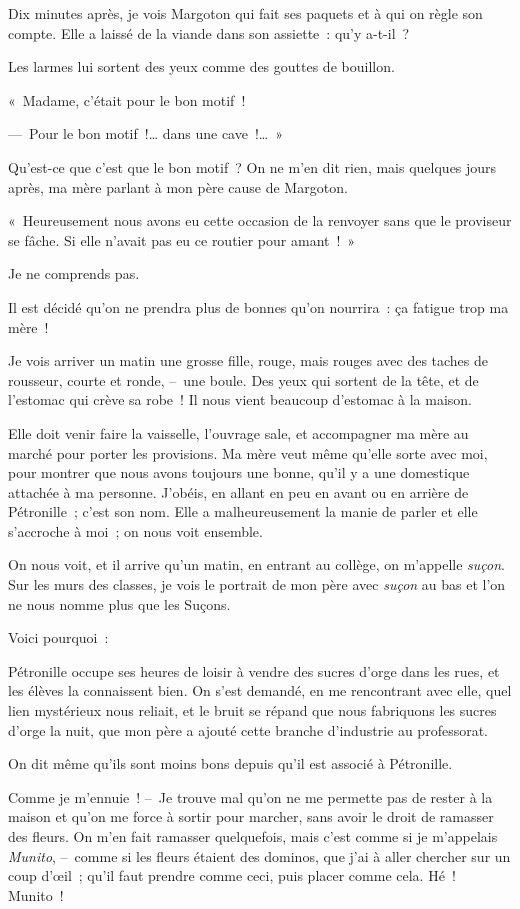 \documentclass[french,twoside]{book} %
\begin{document}
Dix minutes après, je vois Margoton qui fait ses paquets et à qui on règle son compte. Elle a laissé de la viande dans son assiette : qu’y a-t-il ?\par
Les larmes lui sortent des yeux comme des gouttes de bouillon.\par
« Madame, c’était pour le bon motif !\par
— Pour le bon motif !… dans une cave !… »\par
Qu’est-ce que c’est que le bon motif ? On ne m’en dit rien, mais quelques jours après, ma mère parlant à mon père cause de Margoton.\par
« Heureusement nous avons eu cette occasion de la renvoyer sans que le proviseur se fâche. Si elle n’avait pas eu ce routier pour amant ! »\par
Je ne comprends pas.\par
Il est décidé qu’on ne prendra plus de bonnes qu’on nourrira : ça fatigue trop ma mère !\par
Je vois arriver un matin une grosse fille, rouge, mais rouges avec des taches de rousseur, courte et ronde, – une boule. Des yeux qui sortent de la tête, et de l’estomac qui crève sa robe ! Il nous vient beaucoup d’estomac à la maison.\par
Elle doit venir faire la vaisselle, l’ouvrage sale, et accompagner ma mère au marché pour porter les provisions. Ma mère veut même qu’elle sorte avec moi, pour montrer que nous avons toujours une bonne, qu’il y a une domestique attachée à ma personne. J’obéis, en allant en peu en avant ou en arrière de Pétronille ; c’est son nom. Elle a malheureusement la manie de parler et elle s’accroche à moi ; on nous voit ensemble.\par
On nous voit, et il arrive qu’un matin, en entrant au collège, on m’appelle \emph{suçon}. Sur les murs des classes, je vois le portrait de mon père avec \emph{suçon} au bas et l’on ne nous nomme plus que les Suçons.\par
Voici pourquoi :\par
Pétronille occupe ses heures de loisir à vendre des sucres d’orge dans les rues, et les élèves la connaissent bien. On s’est demandé, en me rencontrant avec elle, quel lien mystérieux nous reliait, et le bruit se répand que nous fabriquons les sucres d’orge la nuit, que mon père a ajouté cette branche d’industrie au professorat.\par
On dit même qu’ils sont moins bons depuis qu’il est associé à Pétronille.\par
\bigbreak
\noindent Comme je m’ennuie ! – Je trouve mal qu’on ne me permette pas de rester à la maison et qu’on me force à sortir pour marcher, sans avoir le droit de ramasser des fleurs. On m’en fait ramasser quelquefois, mais c’est comme si je m’appelais \emph{Munito}, – comme si les fleurs étaient des dominos, que j’ai à aller chercher sur un coup d’œil ; qu’il faut prendre comme ceci, puis placer comme cela. Hé ! Munito !\par
\end{document}
